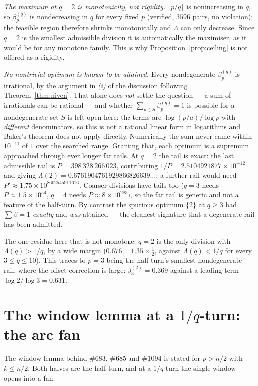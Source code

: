\documentclass[11pt]{article}
\begin{document}
\emph{The maximum at $q=2$ is monotonicity, not rigidity.}  $\lceil p/q\rceil$ is
nonincreasing in $q$, so $\beta_p^{(q)}$ is nondecreasing in $q$ for every fixed $p$
(verified, $3596$ pairs, no violation); the feasible region therefore shrinks monotonically
and $\Lambda$ can only decrease.  Since $q=2$ is the smallest admissible division it is
automatically the maximiser, as it would be for any monotone family.  This is why
Proposition~\ref{prop:ceiling} is not offered as a rigidity.

\emph{No nontrivial optimum is known to be attained.}  Every nondegenerate $\beta_p^{(q)}$ is
irrational, by the argument in \emph{(i)} of the discussion following
Theorem~\ref{thm:niven}.  That alone does \emph{not} settle the
question --- a sum of irrationals can be rational --- and whether
$\sum_{p\in S}\beta_p^{(q)}=1$ is possible for a nondegenerate set $S$ is left open here: the
terms are $\log(p/a)/\log p$ with \emph{different} denominators, so this is not a rational
linear form in logarithms and Baker's theorem does not apply directly.  Numerically the sum
never came within $10^{-11}$ of $1$ over the searched range.  Granting that, each optimum is a
supremum approached through ever longer far tails.  At $q=2$ the tail is exact:
the last admissible rail is $P=398\,328\,266\,023$, contributing
$1/P=2.5104921877\times10^{-12}$ and giving $\Lambda(2)=0.6761904761929866826639\dots$; a
further rail would need $P'\approx1.75\times10^{8602545911616}$.  Coarser divisions have tails
too ($q=3$ needs $P\approx1.5\times10^{54}$, $q=4$ needs $P\approx8\times10^{283}$), so the
far tail is generic and not a feature of the half-turn.  By contrast the spurious optimum
$\{2\}$ at $q\ge3$ had $\sum\beta=1$ \emph{exactly} and \emph{was} attained --- the cleanest
signature that a degenerate rail has been admitted.

The one residue here that is not monotone: $q=2$ is the only division with $\Lambda(q)>1/q$,
by a wide margin ($0.676=1.35\times\tfrac12$, against $\Lambda(q)<1/q$ for every $3\le q\le10$).
This traces to $p=3$ being the half-turn's smallest nondegenerate rail, where the offset
correction is large: $\beta_3^{(2)}=0.369$ against a leading term $\log2/\log3=0.631$.

\section{The window lemma at a $1/q$-turn: the arc fan}

The window lemma behind \#683, \#685 and \#1094 is stated for $p>n/2$ with $k\le n/2$.  Both
halves are the half-turn, and at a $1/q$-turn the single window opens into a fan.
\end{document}
